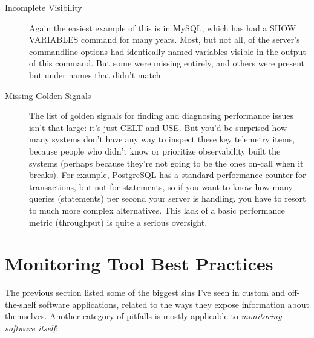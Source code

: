 \documentclass{vivid_layout}
\begin{document}
\begin{description}
\item[Incomplete Visibility] Again the easiest example of this is in MySQL,
which has had a SHOW VARIABLES command for many years. Most, but not all, of the
server's commandline options had identically named variables visible in the
output of this command. But some were missing entirely, and others were present
but under names that didn't match.

\item[Missing Golden Signals] The list of golden signals for finding and diagnosing
performance issues isn't
that large: it's just CELT and USE. But you'd be surprised how many systems don't have any way
to inspect these key telemetry items,
because people who didn't know or prioritize observability built the systems (perhaps because they're not going to be the ones on-call when it breaks). For example,
PostgreSQL has a standard performance counter for transactions, but not for
statements, so if you want to know how many queries (statements) per second your
server is handling, you have to resort to much more complex alternatives. This
lack of a basic performance metric (throughput) is quite a serious oversight.

\end{description}

\section{Monitoring Tool Best Practices}

The previous section listed some of the biggest sins I've seen in custom and off-the-shelf
software applications, related to the ways they expose information about
themselves. Another category of pitfalls is mostly applicable to
\emph{monitoring software itself}:
\end{document}
